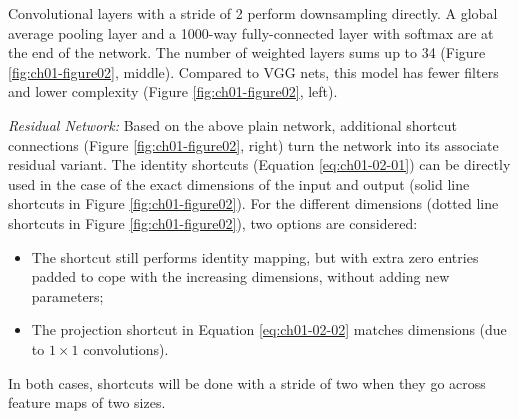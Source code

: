 \documentclass[
]{krantz}
\providecommand{\tightlist}{%
  \setlength{\itemsep}{0pt}\setlength{\parskip}{0pt}}
\begin{document}
Convolutional layers with a stride of 2 perform downsampling directly. A global average pooling layer and a 1000-way fully-connected layer with softmax are at the end of the network. The number of weighted layers sums up to 34 (Figure \ref{fig:ch01-figure02}, middle). Compared to VGG nets, this model has fewer filters and lower complexity (Figure \ref{fig:ch01-figure02}, left).

\emph{Residual Network:} Based on the above plain network, additional shortcut connections (Figure \ref{fig:ch01-figure02}, right) turn the network into its associate residual variant. The identity shortcuts (Equation \eqref{eq:ch01-02-01}) can be directly used in the case of the exact dimensions of the input and output (solid line shortcuts in Figure \ref{fig:ch01-figure02}). For the different dimensions (dotted line shortcuts in Figure \ref{fig:ch01-figure02}), two options are considered:

\begin{itemize}
\tightlist
\item
  The shortcut still performs identity mapping, but with extra zero entries padded to cope with the increasing dimensions, without adding new parameters;
\item
  The projection shortcut in Equation \eqref{eq:ch01-02-02} matches dimensions (due to \(1\times 1\) convolutions).
\end{itemize}

In both cases, shortcuts will be done with a stride of two when they go across feature maps of two sizes.
\end{document}
